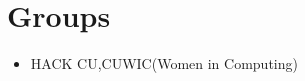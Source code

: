 \documentclass[10pt,a4paper,sans]{moderncv} %
\begin{document}
\section{Groups}
\begin{itemize}
\item {}{HACK CU,CUWIC(Women in Computing)}
\end{itemize}

\end{document}
